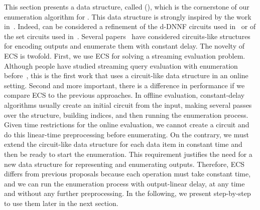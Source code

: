 

This section presents a data structure, called \dsnamebigcaps{} (\dsabbr{}), which is the cornerstone of our enumeration algorithm for \vpann. This data structure is strongly inspired by the work in~\cite{AmarilliBJM17,AmarilliBMN19}. Indeed, \dsabbr{} can be considered a refinement of the d-DNNF circuits used in~\cite{AmarilliBJM17} or of the set circuits used in~\cite{AmarilliBMN19}.
Several papers~\cite{OlteanuZ15,AmarilliBJM17,AmarilliBMN19pods,Torunczyk20}   have considered circuits-like structures for encoding outputs and enumerate them with constant delay. The novelty of ECS is twofold. First, we use ECS for solving a streaming evaluation problem. Although people have studied streaming query evaluation with enumeration before~\cite{IdrisUV17,BerkholzKS17}, this is the first work that uses a circuit-like data structure in an online setting. 
Second and more important, there is a difference in performance if we compare ECS to the previous approaches.
In offline evaluation, constant-delay algorithms usually create an initial circuit from the input, making several passes over the structure, building indices, and then running the enumeration process. Given time restrictions for the online evaluation, we cannot create a circuit and do this linear-time preprocessing before enumerating. On the contrary, we must extend the circuit-like data structure for each data item in constant time and then be ready to start the enumeration. This requirement justifies the need for a new data structure for representing and enumerating outputs.  Therefore, ECS differs from previous proposals because each operation must take constant time, and we can run the enumeration process with output-linear delay, at any time and without any further preprocessing. In the following, we present \dsabbr{} step-by-step to use them later in the next section.



